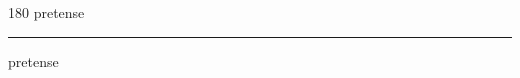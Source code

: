 
\begin{frame}
\begin{center}
\begin{turn}{180}
{\fontsize{2.5cm}{1em}\selectfont pretense}
\end{turn}
\vspace{1em}\par  
\hrule
\vspace{1em}\par  
{\fontsize{2.5cm}{1em}\selectfont pretense}
\end{center}
\end{frame}
